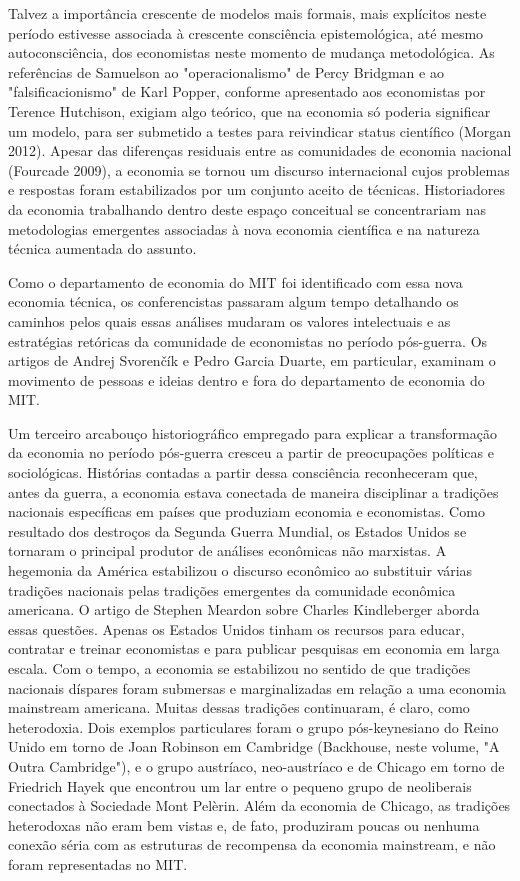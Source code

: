 \documentclass[a4paper,12pt]{article}[abntex2]
\begin{document}
Talvez a importância crescente de modelos mais formais, mais explícitos neste período estivesse associada à crescente consciência epistemológica, até mesmo autoconsciência, dos economistas neste momento de mudança metodológica. As referências de Samuelson ao "operacionalismo" de Percy Bridgman e ao "falsificacionismo" de Karl Popper, conforme apresentado aos economistas por Terence Hutchison, exigiam algo teórico, que na economia só poderia significar um modelo, para ser submetido a testes para reivindicar status científico (Morgan 2012). Apesar das diferenças residuais entre as comunidades de economia nacional (Fourcade 2009), a economia se tornou um discurso internacional cujos problemas e respostas foram estabilizados por um conjunto aceito de técnicas. Historiadores da economia trabalhando dentro deste espaço conceitual se concentrariam nas metodologias emergentes associadas à nova economia científica e na natureza técnica aumentada do assunto.

Como o departamento de economia do MIT foi identificado com essa nova economia técnica, os conferencistas passaram algum tempo detalhando os caminhos pelos quais essas análises mudaram os valores intelectuais e as estratégias retóricas da comunidade de economistas no período pós-guerra. Os artigos de Andrej Svorenčík e Pedro Garcia Duarte, em particular, examinam o movimento de pessoas e ideias dentro e fora do departamento de economia do MIT.

Um terceiro arcabouço historiográfico empregado para explicar a transformação da economia no período pós-guerra cresceu a partir de preocupações políticas e sociológicas. Histórias contadas a partir dessa consciência reconheceram que, antes da guerra, a economia estava conectada de maneira disciplinar a tradições nacionais específicas em países que produziam economia e economistas. Como resultado dos destroços da Segunda Guerra Mundial, os Estados Unidos se tornaram o principal produtor de análises econômicas não marxistas. A hegemonia da América estabilizou o discurso econômico ao substituir várias tradições nacionais pelas tradições emergentes da comunidade econômica americana. O artigo de Stephen Meardon sobre Charles Kindleberger aborda essas questões. Apenas os Estados Unidos tinham os recursos para educar, contratar e treinar economistas e para publicar pesquisas em economia em larga escala. Com o tempo, a economia se estabilizou no sentido de que tradições nacionais díspares foram submersas e marginalizadas em relação a uma economia mainstream americana. Muitas dessas tradições continuaram, é claro, como heterodoxia. Dois exemplos particulares foram o grupo pós-keynesiano do Reino Unido em torno de Joan Robinson em Cambridge (Backhouse, neste volume, "A Outra Cambridge"), e o grupo austríaco, neo-austríaco e de Chicago em torno de Friedrich Hayek que encontrou um lar entre o pequeno grupo de neoliberais conectados à Sociedade Mont Pelèrin. Além da economia de Chicago, as tradições heterodoxas não eram bem vistas e, de fato, produziram poucas ou nenhuma conexão séria com as estruturas de recompensa da economia mainstream, e não foram representadas no MIT.
\end{document}
